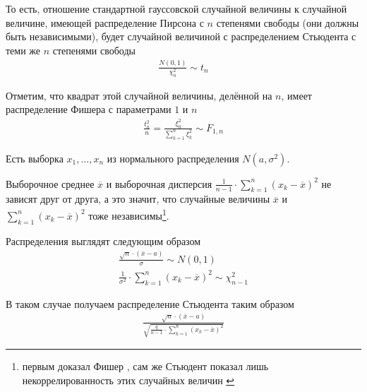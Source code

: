 То есть, отношение стандартной гауссовской случайной величины к случайной
величине, имеющей распределение Пирсона с $n$ степенями свободы (они должны быть
независимыми), будет случайной величиной с распределением Стьюдента с теми же
$n$ степенями свободы
\begin{align*}
    \frac{N\left( 0, 1 \right)}{\chi_n^2} \sim t_n
\end{align*}

Отметим, что квадрат этой случайной величины, делённой на $n$, имеет
распределение Фишера с параметрами $1$ и $n$
\begin{align*}
    \frac{t_n^2}{n}
    = \frac{\xi_0^2}{\sum_{k=1}^{n}\xi_k^2}
    \sim F_{1, n}
\end{align*}

\begin{example}
    Есть выборка $x_1, \dots, x_n$ из нормального распределения
    $N\left( a, \sigma^2 \right)$.

    Выборочное среднее $\overline{x}$ и выборочная дисперсия
    $\frac{1}{n-1} \cdot \sum_{k=1}^{n} \left( x_k - \overline{x} \right)^2$
    не зависят друг от друга, а это значит, что случайные величины
    $\overline{x}$ и $\sum_{k=1}^{n} \left( x_k - \overline{x} \right)^2$ тоже
    независимы\footnote{первым доказал Фишер \cite{FisherStudentApplication},
    сам же Стьюдент показал лишь некоррелированность этих случайных величин
    \cite{StudentProbableError}}.

    Распределения выглядят следующим образом
    \begin{align*}
        \frac{\sqrt{n} \cdot \left( \overline{x} - a \right)}{\sigma}
            \sim N\left( 0, 1 \right) \\
        \frac{1}{\sigma^2}
                \cdot \sum_{k=1}^{n}\left( x_k - \overline{x} \right)^2
                \sim \chi_{n-1}^2
    \end{align*}

    В таком случае получаем распределение Стьюдента таким образом
    \begin{align*}
        \frac{\sqrt{n} \cdot \left( \overline{x} - a \right)}{
            \sqrt{\frac{q}{n-1}
                \cdot \sum_{k=1}^{n}\left( x_k - \overline{x} \right)^2}}
    \end{align*}
\end{example}

